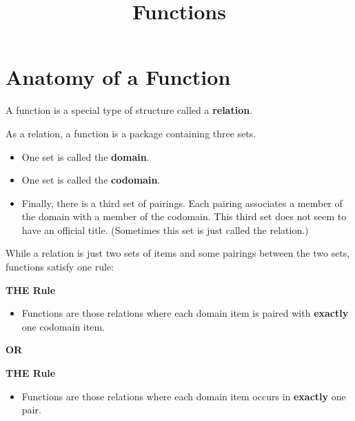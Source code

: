 \documentclass{ximera}
\title{Functions}
\begin{document}
\begin{abstract}
\end{abstract}
\maketitle





\section*{Anatomy of a Function}


A function is a special type of structure called a \textbf{\textcolor{blue!55!black}{relation}}.  



As a relation, a function is a package containing three sets. 


\begin{itemize}
\item One set is called the \textbf{\textcolor{purple!85!blue}{domain}}. 
\item One set is called the \textbf{\textcolor{purple!85!blue}{codomain}}.  
\item Finally, there is a third set of pairings.  Each pairing associates a member of the domain with a member of the codomain. This third set does not seem to have an official title. (Sometimes this set is just called the relation.)
\end{itemize}


While a relation is just two sets of items and some pairings between the two sets, functions satisfy one rule: 





\begin{condition} \textbf{\textcolor{green!50!black}{THE Rule}}  


\begin{itemize}
\item Functions are those relations where each domain item is paired with \textbf{exactly} one codomain item.
\end{itemize}
\end{condition}


\begin{center}
\textbf{OR}
\end{center}


\begin{condition} \textbf{\textcolor{green!50!black}{THE Rule}} 


\begin{itemize}
\item Functions are those relations where each domain item occurs in \textbf{exactly} one pair.
\end{itemize}
\end{condition}
\end{document}
